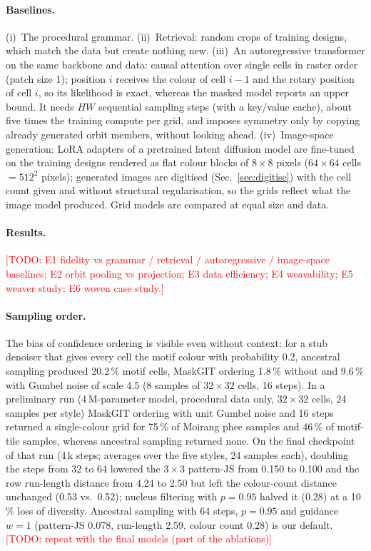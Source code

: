 \documentclass[11pt]{article}
\newcommand{\todo}[1]{\textcolor{red}{[TODO: #1]}}
\begin{document}
\paragraph{Baselines.}
(i)~The procedural grammar. (ii)~Retrieval: random crops of training designs, which match the data
but create nothing new. (iii)~An autoregressive transformer on the same backbone and data: causal
attention over single cells in raster order (patch size 1); position $i$ receives the colour of cell
$i-1$ and the rotary position of cell $i$, so its likelihood is exact, whereas the masked model
reports an upper bound. It needs $HW$ sequential sampling steps (with a key/value cache), about
five times the training compute per grid, and imposes symmetry only by copying already generated
orbit members, without looking ahead. (iv)~Image-space generation: LoRA adapters
\cite{hu2022lora} of a pretrained latent diffusion model \cite{rombach2022high} are fine-tuned on the training designs
rendered as flat colour blocks of $8\times8$ pixels ($64\times64$ cells $=512^2$ pixels); generated
images are digitised (Sec.~\ref{sec:digitise}) with the cell count given and without structural
regularisation, so the grids reflect what the image model produced. Grid models are compared at
equal size and data.

\paragraph{Results.} \todo{E1 fidelity vs grammar / retrieval / autoregressive / image-space
baselines; E2 orbit pooling vs projection; E3 data efficiency; E4 weavability; E5 weaver study;
E6 woven case study.}

\paragraph{Sampling order.} The bias of confidence ordering is visible even without context: for
a stub denoiser that gives every cell the motif colour with probability 0.2, ancestral sampling
produced 20.2\,\% motif cells, MaskGIT ordering 1.8\,\% without and 9.6\,\% with Gumbel noise of
scale 4.5 (8 samples of $32\times32$ cells, 16 steps). In a preliminary run (4\,M-parameter model, procedural data only,
$32\times32$ cells, 24 samples per style) MaskGIT ordering with unit Gumbel noise and 16 steps
returned a single-colour grid for 75\,\% of Moirang phee samples and 46\,\% of motif-tile samples,
whereas ancestral sampling returned none. On the final checkpoint of that run (4\,k steps;
averages over the five styles, 24 samples each), doubling the steps from 32 to 64 lowered the
$3\times3$ pattern-JS from 0.150 to 0.100 and the row run-length distance from 4.24 to 2.50 but left
the colour-count distance unchanged (0.53 vs.\ 0.52); nucleus filtering with $p=0.95$ halved it
(0.28) at a 10\,\% loss of diversity. Ancestral sampling with 64 steps, $p=0.95$ and guidance
$w=1$ (pattern-JS 0.078, run-length 2.59, colour count 0.28) is our default.
\todo{repeat with the final models (part of the ablations)}
\end{document}
